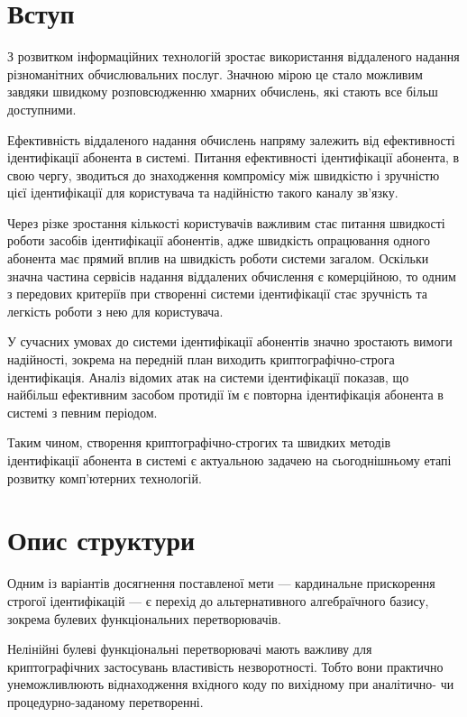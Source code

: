 \documentclass[12pt]{article}
\begin{document}
\section{Вступ}

З розвитком інформаційних технологій зростає використання віддаленого надання різноманітних обчислювальних послуг.
Значною мірою це стало можливим завдяки швидкому розповсюдженню хмарних обчислень, які стають все більш доступними.

Ефективність віддаленого надання обчислень напряму залежить від ефективності ідентифікації абонента в системі.
Питання ефективності ідентифікації абонента, в свою чергу, зводиться до знаходження компромісу між швидкістю і зручністю цієї ідентифікації для користувача та надійністю такого каналу зв'язку.

Через різке зростання кількості користувачів важливим стає питання швидкості роботи засобів ідентифікації абонентів, адже швидкість опрацювання одного абонента має прямий вплив на швидкість роботи системи загалом.
Оскільки значна частина сервісів надання віддалених обчислення є комерційною, то одним з передових критеріїв при створенні системи ідентифікації стає зручність та легкість роботи з нею для користувача.

У сучасних умовах до системи ідентифікації абонентів значно зростають вимоги надійності, зокрема на передній план виходить криптографічно-строга ідентифікація.
Аналіз відомих атак на системи ідентифікації показав, що найбільш ефективним засобом протидії їм є повторна ідентифікація  абонента в системі з певним періодом.

Таким чином, створення криптографічно-строгих та швидких методів ідентифікації абонента в системі є актуальною задачею на сьогоднішньому етапі розвитку комп'ютерних технологій.

\section{Опис структури}

Одним із варіантів досягнення поставленої мети --- кардинальне прискорення строгої ідентифікацій --- є перехід до альтернативного алгебраїчного базису, зокрема булевих функціональних перетворювачів.

Нелінійні булеві функціональні перетворювачі мають важливу для криптографічних застосувань властивість незворотності. Тобто вони практично унеможливлюють віднаходження вхідного коду по вихідному при аналітично- чи процедурно-заданому перетворенні.
\end{document}
